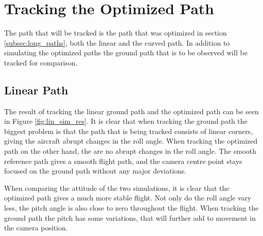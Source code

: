\section{Tracking the Optimized Path}

The path that will be tracked is the path that was optimized in section \ref{subsec:long_paths}, both the linear and the curved path. In addition to simulating the optimized paths the ground path that is to be observed will be tracked for comparison.


\subsection{Linear Path}

The result of tracking the linear ground path and the optimized path can be seen in Figure \ref{fig:lin_sim_res}. It is clear that when tracking the ground path the biggest problem is that the path that is being tracked consists of linear corners, giving the aircraft abrupt changes in the roll angle. When tracking the optimized path on the other hand, the are no abrupt changes in the roll angle. The smooth reference path gives a smooth flight path, and the camera centre point stays focused on the ground path without any major deviations.

When comparing the attitude of the two simulations, it is clear that the optimized path gives a much more stable flight. Not only do the roll angle vary less, the pitch angle is also close to zero throughout the flight. When tracking the ground path the pitch has some variations, that will further add to movement in the camera position. 

